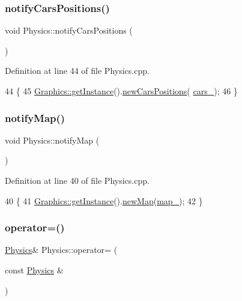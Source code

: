 \subsubsection{\texorpdfstring{notify\+Cars\+Positions()}{notifyCarsPositions()}}
{\footnotesize\ttfamily void Physics\+::notify\+Cars\+Positions (\begin{DoxyParamCaption}{ }\end{DoxyParamCaption})}



Definition at line 44 of file Physics.\+cpp.


\begin{DoxyCode}
44                                   \{
45     \hyperlink{classGraphics_a115d78c8686f6c82add227bf1fe2c81c}{Graphics::getInstance}().\hyperlink{classGraphics_a5f2e6a6cc8dffc34b48e66df42046243}{newCarsPositions}(
      \hyperlink{classPhysics_ad798f52a18a2e5975f349b1fd95ceefc}{cars\_});
46 \}
\end{DoxyCode}
\mbox{\label{classPhysics_adb2d289adeba022a24562bfcd374df38}} 
\subsubsection{\texorpdfstring{notify\+Map()}{notifyMap()}}
{\footnotesize\ttfamily void Physics\+::notify\+Map (\begin{DoxyParamCaption}{ }\end{DoxyParamCaption})}



Definition at line 40 of file Physics.\+cpp.


\begin{DoxyCode}
40                         \{
41     \hyperlink{classGraphics_a115d78c8686f6c82add227bf1fe2c81c}{Graphics::getInstance}().\hyperlink{classGraphics_adf0937a71f5d477bcd9c553fe863e87b}{newMap}(\hyperlink{classPhysics_a1f2b9c2d5ad391eff5e6ebd5cdf495fe}{map\_});
42 \}
\end{DoxyCode}
\mbox{\label{classPhysics_ac67d8ce0efaaaf9b442863f8085619fe}} 
\subsubsection{\texorpdfstring{operator=()}{operator=()}}
{\footnotesize\ttfamily \hyperlink{classPhysics}{Physics}\& Physics\+::operator= (\begin{DoxyParamCaption}\item[{const \hyperlink{classPhysics}{Physics} \&}]{ }\end{DoxyParamCaption})\hspace{0.3cm}{\ttfamily [delete]}}

